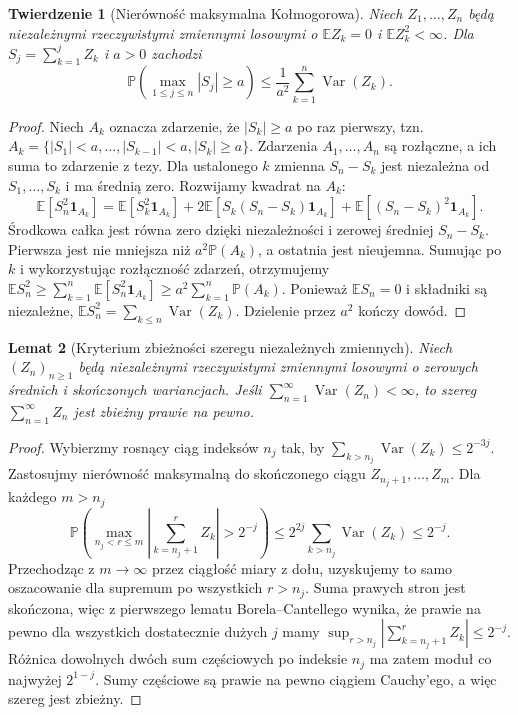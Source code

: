 \documentclass[11pt,a4paper,oneside]{report}
\numberwithin{equation}{chapter}
\theoremstyle{plain}
\newtheorem{twierdzenie}{Twierdzenie}[chapter]
\newtheorem{lemat}[twierdzenie]{Lemat}
\theoremstyle{definition}
\theoremstyle{remark}
\newcommand{\Prob}{\mathbb{P}}
\newcommand{\E}{\mathbb{E}}
\newcommand{\Var}{\operatorname{Var}}
\newcommand{\ind}[1]{\mathbf{1}_{#1}}
\begin{document}
\begin{twierdzenie}[Nierówność maksymalna Kołmogorowa]
Niech $Z_1,\ldots,Z_n$ będą niezależnymi rzeczywistymi
zmiennymi losowymi o $\E Z_k=0$ i
$\E Z_k^2<\infty$. Dla $S_j=\sum_{k=1}^j Z_k$
i $a>0$ zachodzi
\[
\Prob\!\left(\max_{1\leq j\leq n}|S_j|\geq a\right)
\leq\frac1{a^2}\sum_{k=1}^n\Var(Z_k).
\]
\end{twierdzenie}
\begin{proof}
Niech $A_k$ oznacza zdarzenie, że $|S_k|\geq a$
po raz pierwszy, tzn.
$A_k=\{|S_1|<a,\ldots,|S_{k-1}|<a,|S_k|\geq a\}$.
Zdarzenia $A_1,\ldots,A_n$ są rozłączne, a ich suma
to zdarzenie z tezy. Dla ustalonego $k$ zmienna
$S_n-S_k$ jest niezależna od $S_1,\ldots,S_k$
i ma średnią zero. Rozwijamy kwadrat na $A_k$:
\[
\E[S_n^2\ind{A_k}]
=\E[S_k^2\ind{A_k}]
+2\E[S_k(S_n-S_k)\ind{A_k}]
+\E[(S_n-S_k)^2\ind{A_k}].
\]
Środkowa całka jest równa zero dzięki niezależności
i zerowej średniej $S_n-S_k$. Pierwsza jest nie mniejsza
niż $a^2\Prob(A_k)$, a ostatnia jest nieujemna.
Sumując po $k$ i wykorzystując rozłączność zdarzeń,
otrzymujemy
$\E S_n^2\geq\sum_{k=1}^n\E[S_n^2\ind{A_k}]
\geq a^2\sum_{k=1}^n\Prob(A_k)$.
Ponieważ $\E S_n=0$ i składniki są niezależne,
$\E S_n^2=\sum_{k\leq n}\Var(Z_k)$. Dzielenie przez
$a^2$ kończy dowód.
\end{proof}

\begin{lemat}[Kryterium zbieżności szeregu niezależnych zmiennych]
Niech $(Z_n)_{n\geq1}$ będą niezależnymi rzeczywistymi
zmiennymi losowymi o zerowych średnich i skończonych
wariancjach. Jeśli $\sum_{n=1}^\infty\Var(Z_n)<\infty$,
to szereg $\sum_{n=1}^\infty Z_n$ jest zbieżny
prawie na pewno.
\end{lemat}
\begin{proof}
Wybierzmy rosnący ciąg indeksów $n_j$ tak, by
$\sum_{k>n_j}\Var(Z_k)\leq2^{-3j}$.
Zastosujmy nierówność maksymalną do skończonego
ciągu $Z_{n_j+1},\ldots,Z_m$. Dla każdego $m>n_j$
\[
\Prob\!\left(\max_{n_j<r\leq m}
\left|\sum_{k=n_j+1}^rZ_k\right|>2^{-j}\right)
\leq 2^{2j}\sum_{k>n_j}\Var(Z_k)\leq2^{-j}.
\]
Przechodząc z $m\to\infty$ przez ciągłość miary
z dołu, uzyskujemy to samo oszacowanie dla
supremum po wszystkich $r>n_j$.
Suma prawych stron jest skończona, więc z pierwszego
lematu Borela--Cantellego wynika, że prawie na pewno
dla wszystkich dostatecznie dużych $j$ mamy
$\sup_{r>n_j}|\sum_{k=n_j+1}^rZ_k|\leq2^{-j}$.
Różnica dowolnych dwóch sum częściowych po indeksie
$n_j$ ma zatem moduł co najwyżej $2^{1-j}$.
Sumy częściowe są prawie na pewno ciągiem Cauchy'ego,
a więc szereg jest zbieżny.
\end{proof}
\end{document}
